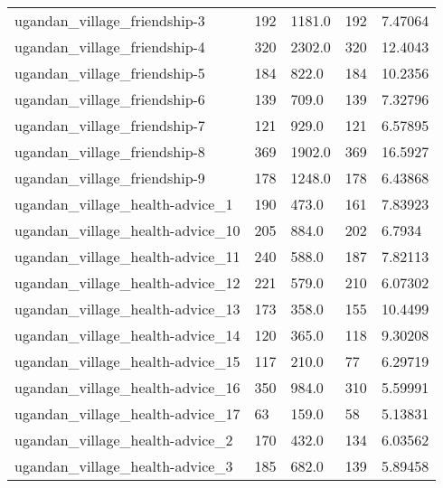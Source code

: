 \begin{longtable}{lllll}
 ugandan\_village\_friendship-3                       & 192        & 1181.0      & 192   & 7.47064    \\
 ugandan\_village\_friendship-4                       & 320        & 2302.0      & 320   & 12.4043    \\
 ugandan\_village\_friendship-5                       & 184        & 822.0       & 184   & 10.2356    \\
 ugandan\_village\_friendship-6                       & 139        & 709.0       & 139   & 7.32796    \\
 ugandan\_village\_friendship-7                       & 121        & 929.0       & 121   & 6.57895    \\
 ugandan\_village\_friendship-8                       & 369        & 1902.0      & 369   & 16.5927    \\
 ugandan\_village\_friendship-9                       & 178        & 1248.0      & 178   & 6.43868    \\
 ugandan\_village\_health-advice\_1                    & 190        & 473.0       & 161   & 7.83923    \\
 ugandan\_village\_health-advice\_10                   & 205        & 884.0       & 202   & 6.7934     \\
 ugandan\_village\_health-advice\_11                   & 240        & 588.0       & 187   & 7.82113    \\
 ugandan\_village\_health-advice\_12                   & 221        & 579.0       & 210   & 6.07302    \\
 ugandan\_village\_health-advice\_13                   & 173        & 358.0       & 155   & 10.4499    \\
 ugandan\_village\_health-advice\_14                   & 120        & 365.0       & 118   & 9.30208    \\
 ugandan\_village\_health-advice\_15                   & 117        & 210.0       & 77    & 6.29719    \\
 ugandan\_village\_health-advice\_16                   & 350        & 984.0       & 310   & 5.59991    \\
 ugandan\_village\_health-advice\_17                   & 63         & 159.0       & 58    & 5.13831    \\
 ugandan\_village\_health-advice\_2                    & 170        & 432.0       & 134   & 6.03562    \\
 ugandan\_village\_health-advice\_3                    & 185        & 682.0       & 139   & 5.89458    \\

\end{longtable}
